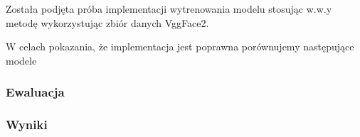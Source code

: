 Została podjęta próba implementacji wytrenowania modelu stosując w.w.y metodę wykorzystując zbiór danych VggFace2. 

W celach pokazania, że implementacja jest poprawna porównujemy następujące modele

\subsubsection{Ewaluacja}


\subsubsection{Wyniki}




